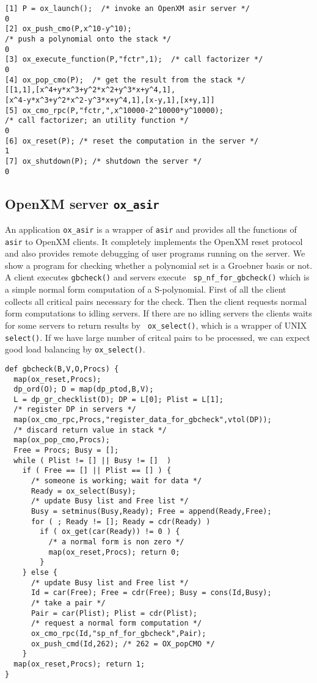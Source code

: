 \documentclass[runningheads]{cl2emult}
\begin{document}
\begin{verbatim}
[1] P = ox_launch();  /* invoke an OpenXM asir server */
0
[2] ox_push_cmo(P,x^10-y^10);
/* push a polynomial onto the stack */
0
[3] ox_execute_function(P,"fctr",1);  /* call factorizer */
0
[4] ox_pop_cmo(P);  /* get the result from the stack */
[[1,1],[x^4+y*x^3+y^2*x^2+y^3*x+y^4,1],
[x^4-y*x^3+y^2*x^2-y^3*x+y^4,1],[x-y,1],[x+y,1]]
[5] ox_cmo_rpc(P,"fctr,",x^10000-2^10000*y^10000); 
/* call factorizer; an utility function */
0
[6] ox_reset(P); /* reset the computation in the server */
1
[7] ox_shutdown(P); /* shutdown the server */
0
\end{verbatim}

\subsection{OpenXM server {\tt ox\_asir}}

An application {\tt ox\_asir} is a wrapper of {\tt asir} and provides
all the functions of {\tt asir} to OpenXM clients. It completely
implements the OpenXM reset protocol and also provides remote
debugging of user programs running on the server. We show a program
for checking whether a polynomial set is a Groebner basis or not. A
client executes {\tt gbcheck()} and servers execute {\tt
sp\_nf\_for\_gbcheck()} which is a simple normal form computation of a
S-polynomial. First of all the client collects all critical pairs
necessary for the check. Then the client requests normal form
computations to idling servers. If there are no idling servers the
clients waits for some servers to return results by {\tt
ox\_select()}, which is a wrapper of UNIX {\tt select()}. If we have
large number of critcal pairs to be processed, we can expect
good load balancing by {\tt ox\_select()}.

\begin{verbatim}
def gbcheck(B,V,O,Procs) {
  map(ox_reset,Procs);
  dp_ord(O); D = map(dp_ptod,B,V);  
  L = dp_gr_checklist(D); DP = L[0]; Plist = L[1];
  /* register DP in servers */
  map(ox_cmo_rpc,Procs,"register_data_for_gbcheck",vtol(DP));
  /* discard return value in stack */
  map(ox_pop_cmo,Procs);
  Free = Procs; Busy = [];
  while ( Plist != [] || Busy != []  )
    if ( Free == [] || Plist == [] ) {
      /* someone is working; wait for data */
      Ready = ox_select(Busy);
	  /* update Busy list and Free list */
      Busy = setminus(Busy,Ready); Free = append(Ready,Free);
      for ( ; Ready != []; Ready = cdr(Ready) )
        if ( ox_get(car(Ready)) != 0 ) {
		  /* a normal form is non zero */
          map(ox_reset,Procs); return 0;
        }
    } else {
	  /* update Busy list and Free list */
      Id = car(Free); Free = cdr(Free); Busy = cons(Id,Busy);
	  /* take a pair */
	  Pair = car(Plist); Plist = cdr(Plist);
	  /* request a normal form computation */
      ox_cmo_rpc(Id,"sp_nf_for_gbcheck",Pair);
      ox_push_cmd(Id,262); /* 262 = OX_popCMO */
    }
  map(ox_reset,Procs); return 1;
}
\end{verbatim}
\end{document}

